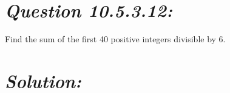 \documentclass[journal,12pt,twocolumn]{IEEEtran}
\theoremstyle{remark}
\begin{document}



\maketitle

\newpage


\bigskip
 
\renewcommand{\thefigure}{\theenumi}
\renewcommand{\thetable}{\theenumi}
\section*{\textit{\textbf{Question 10.5.3.12:}}}
 Find the sum of the first 40 positive integers divisible by 6.
\section*{\textit{\textbf{Solution:}}}

\end{document}
